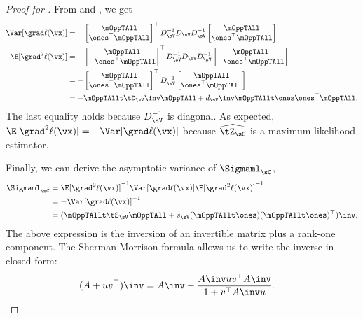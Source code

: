 \begin{proof}[Proof for ]
From  and , we get
  \begin{align*}
    \Var [\grad \ell(\vx)] &= \hphantom{-}
        \begin{bmatrix}
          \mOppTAll \\
          \ones^\top \mOppTAll
        \end{bmatrix}^\top
          D_{\sV}^{-1} D_\sV D_{\sV}^{-1} 
        \begin{bmatrix}
          \mOppTAll \\
          \ones^\top \mOppTAll
        \end{bmatrix} \\
        \E[\grad^2 \ell(\vx)] 
        &= -
        \begin{bmatrix}
          \mOppTAll \\
          - \ones^\top \mOppTAll
        \end{bmatrix}^\top
          D_{\sV}^{-1} D_\sV D_{\sV}^{-1} 
        \begin{bmatrix}
          \mOppTAll \\
          - \ones^\top \mOppTAll
        \end{bmatrix} \\
        &= -
        \begin{bmatrix}
          \mOppTAll \\
          \ones^\top \mOppTAll
        \end{bmatrix}^\top
          D_{\sV}^{-1} 
        \begin{bmatrix}
          \mOppTAll \\
          \ones^\top \mOppTAll
        \end{bmatrix} \\
   &=
    - \mOppTAllt \tD_\sV\inv \mOppTAll + d_\sV\inv \mOppTAllt \ones \ones^\top \mOppTAll,
  \end{align*}
The last equality holds because $D_{\sV}^{-1}$ is diagonal.
As expected, $\E[\grad^2 \ell(\vx)] = -\Var [\grad \ell(\vx)]$ because
$\widehat{\tZ_\sC}$ is a maximum likelihood estimator. 

Finally, we can derive the asymptotic variance of $\Sigmaml_\sC$,
\begin{align*}
    \Sigmaml_{\sC} 
      &= \E[\grad^2 \ell(\vx)]^{-1} \Var [\grad \ell(\vx)] \E[\grad^2 \ell(\vx)]^{-1} \\
      &= -\Var[\grad \ell(\vx)]^{-1} \\
      &= (\mOppTAllt \tS_\sV \mOppTAll + s_\sV (\mOppTAllt \ones)(\mOppTAllt \ones)^\top)\inv,
\end{align*}
The above expression is the inversion of an invertible matrix plus a rank-one component. The Sherman-Morrison formula allows us to write the inverse in closed form:
\begin{align*}
  (A + uv^\top)\inv &= A\inv - \frac{A\inv uv^\top A\inv}{1 + v^\top A\inv u}.
\end{align*}


\end{proof}
